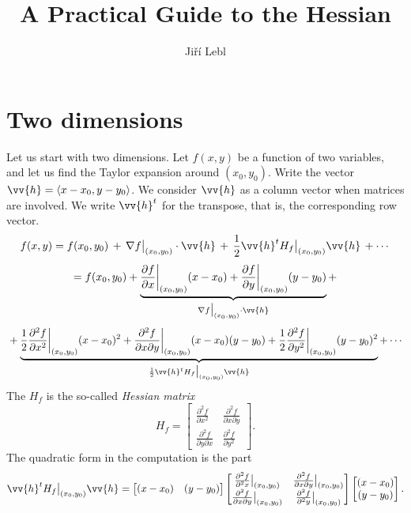 \documentclass[12pt]{article}
\title{A Practical Guide to the Hessian}
\author{Ji\v{r}\'i Lebl}
\begin{document}
\maketitle

\section*{Two dimensions}

Let us start with two dimensions.
Let $f(x,y)$ be a function of two variables, and let us
find the
Taylor expansion around $(x_0,y_0)$.
Write the vector $\vv{h} = \langle x-x_0, y-y_0 \rangle$.  We
consider $\vv{h}$ as a column vector when matrices are involved.
We write $\vv{h}^t$ for the transpose, that is, the corresponding
row vector.
$$
f(x,y) = f(x_0,y_0) \, + \,
\nabla f\big|_{(x_0,y_0)} \cdot \vv{h}
\, + \,
\frac{1}{2} \vv{h}^{t} H_f\big|_{(x_0,y_0)} \vv{h} \,
+ \cdots
$$
$$
 = f(x_0,y_0) +
\underbrace{\frac{\partial f}{\partial x}\bigg|_{(x_0,y_0)} (x-x_0) +
\frac{\partial f}{\partial y}\bigg|_{(x_0,y_0)} (y-y_0)}_{\nabla
f\big|_{(x_0,y_0)} \cdot \vv{h}}
+ {}
$$
$$
{} +
\underbrace{%
\frac{1}{2} \frac{\partial^2 f}{\partial x^2}\bigg|_{(x_0,y_0)} (x-x_0)^2 +
\frac{\partial^2 f}{\partial x \partial y}\bigg|_{(x_0,y_0)} (x-x_0)(y-y_0) +
\frac{1}{2} \frac{\partial^2 f}{\partial y^2}\bigg|_{(x_0,y_0)} (y-y_0)^2}_{%
\frac{1}{2} \vv{h}^{t} H_f\big|_{(x_0,y_0)} \vv{h}}
+
\cdots
$$
The $H_f$ is the so-called \emph{Hessian matrix}
\begin{equation*}
H_f
=
\begin{bmatrix}
\frac{\partial^2 f}{\partial x^2} &
\frac{\partial^2 f}{\partial x \partial y} \\
\frac{\partial^2 f}{\partial y \partial x} &
\frac{\partial^2 f}{\partial y^2}
\end{bmatrix}
.
\end{equation*}
The quadratic form in the computation is the part
\begin{equation*}
\vv{h}^{t} H_f \big|_{(x_0,y_0)} \vv{h}
=
\begin{bmatrix}
(x-x_0) & (y-y_0)
\end{bmatrix}
\begin{bmatrix}
\frac{\partial^2 f}{\partial^2 x}\big|_{(x_0,y_0)} &
\frac{\partial^2 f}{\partial x \partial y}\big|_{(x_0,y_0)} \\
\frac{\partial^2 f}{\partial x \partial y}\big|_{(x_0,y_0)} &
\frac{\partial^2 f}{\partial^2 y}\big|_{(x_0,y_0)}
\end{bmatrix}
\begin{bmatrix}
(x-x_0) \\ (y-y_0)
\end{bmatrix}
.
\end{equation*}
\end{document}
